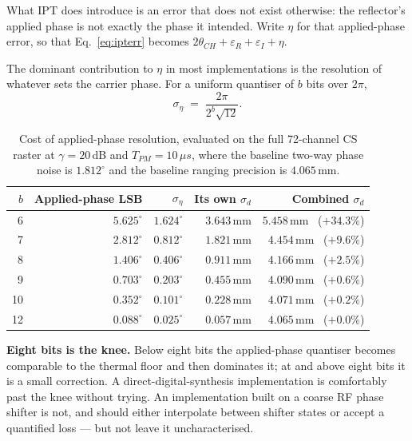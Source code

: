 \documentclass[11pt,a4paper]{article}
\newcommand{\us}{\,\ensuremath{\upmu}s}
\newcommand{\IPT}{\ensuremath{\mathrm{IPT}}}
\newcommand{\Tpm}{T_{PM}}
\providecommand{\upmu}{\mu}
\begin{document}
What \IPT{} does introduce is an error that does not exist otherwise: the reflector's applied phase
is not exactly the phase it intended. Write $\eta$ for that applied-phase error, so that
Eq.~\eqref{eq:ipterr} becomes $2\theta_{CH} + \varepsilon_R + \varepsilon_I + \eta$.

The dominant contribution to $\eta$ in most implementations is the resolution of whatever sets the
carrier phase. For a uniform quantiser of $b$ bits over $2\pi$,
\begin{equation}
\sigma_\eta \;=\; \frac{2\pi}{2^{b}\sqrt{12}} .
\label{eq:quant}
\end{equation}

\begin{table}[h]
\caption{Cost of applied-phase resolution, evaluated on the full 72-channel CS raster at
$\gamma = 20$\,dB and $\Tpm = 10\us$, where the baseline two-way phase noise is $1.812^{\circ}$ and
the baseline ranging precision is $4.065$\,mm.}
\label{tab:resolution}
\centering\small
\begin{tabular}{@{}rrrrr@{}}
\toprule
$b$ & Applied-phase LSB & $\sigma_\eta$ & Its own $\sigma_d$ & Combined $\sigma_d$ \\
\midrule
6  & $5.625^{\circ}$ & $1.624^{\circ}$ & $3.643$\,mm & $5.458$\,mm \ ($+34.3\%$) \\
7  & $2.812^{\circ}$ & $0.812^{\circ}$ & $1.821$\,mm & $4.454$\,mm \ ($+9.6\%$) \\
8  & $1.406^{\circ}$ & $0.406^{\circ}$ & $0.911$\,mm & $4.166$\,mm \ ($+2.5\%$) \\
9  & $0.703^{\circ}$ & $0.203^{\circ}$ & $0.455$\,mm & $4.090$\,mm \ ($+0.6\%$) \\
10 & $0.352^{\circ}$ & $0.101^{\circ}$ & $0.228$\,mm & $4.071$\,mm \ ($+0.2\%$) \\
12 & $0.088^{\circ}$ & $0.025^{\circ}$ & $0.057$\,mm & $4.065$\,mm \ ($+0.0\%$) \\
\bottomrule
\end{tabular}
\end{table}

\begin{callout}
\textbf{Eight bits is the knee.} Below eight bits the applied-phase quantiser becomes comparable to
the thermal floor and then dominates it; at and above eight bits it is a small correction. A
direct-digital-synthesis implementation is comfortably past the knee without trying. An
implementation built on a coarse RF phase shifter is not, and should either interpolate between
shifter states or accept a quantified loss --- but not leave it uncharacterised.
\end{callout}
\end{document}
